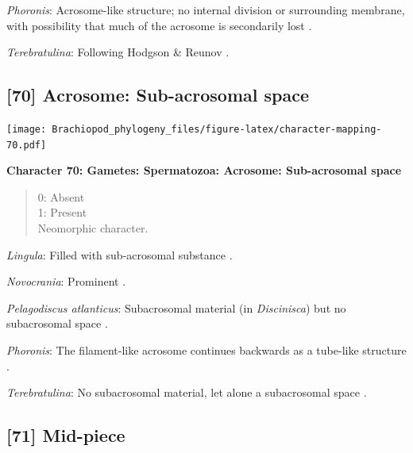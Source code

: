 \documentclass[openany]{book}
\theoremstyle{definition}
\theoremstyle{definition}
\theoremstyle{definition}
\theoremstyle{remark}
\begin{document}
\hypertarget{Phoronis-coding-69}{}
\emph{Phoronis}: Acrosome-like structure; no internal division or
surrounding membrane, with possibility that much of the acrosome is
secondarily lost \citep{Reunov2004Ultrastructuralstudy}.

\hypertarget{Terebratulina-coding-69}{}
\emph{Terebratulina}: Following Hodgson \& Reunov
\citeyearpar{Hodgson1994Ultrastructureof}.

\subsection*{{[}70{]} Acrosome: Sub-acrosomal
space}\label{acrosome-sub-acrosomal-space}

\texttt{[image: Brachiopod\_phylogeny\_files/figure-latex/character-mapping-70.pdf]}

\textbf{Character 70: Gametes: Spermatozoa: Acrosome: Sub-acrosomal
space}

\begin{quote}
0: Absent\\
1: Present\\
Neomorphic character.
\end{quote}

\hypertarget{Lingula-coding-70}{}
\emph{Lingula}: Filled with sub-acrosomal substance
\citep{Fukumoto2003Theacrosome}.

\hypertarget{Novocrania-coding-70}{}
\emph{Novocrania}: Prominent \citep{Afzelius1978Finestructure}.

\hypertarget{Pelagodiscus_atlanticus-coding-70}{}
\emph{Pelagodiscus atlanticus}: Subacrosomal material (in
\emph{Discinisca}) but no subacrosomal space
\citep{Hodgson1994Ultrastructureof}.

\hypertarget{Phoronis-coding-70}{}
\emph{Phoronis}: The filament-like acrosome continues backwards as a
tube-like structure \citep[summarized in
\citet{Jamieson1991FishEvolution}]{Franzen1980Ultrastructureof}.

\hypertarget{Terebratulina-coding-70}{}
\emph{Terebratulina}: No subacrosomal material, let alone a subacrosomal
space \citep[e.g.][]{Hodgson1994Ultrastructureof}.

\subsection*{{[}71{]} Mid-piece}\label{mid-piece}
\end{document}
